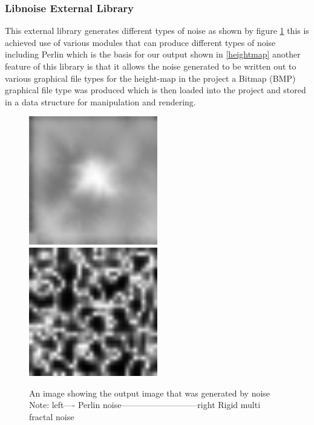 \documentclass[12pt,a4paper]{article}
\begin{document}
\subsubsection{Libnoise External Library}
This external library generates different types of noise as shown by figure \ref{noise} this is achieved use of various modules that can produce different types of noise including Perlin which is the basis for our output shown in \ref{heightmap} another feature of this library is that it allows the noise generated to be written out to various graphical file types for the height-map in the project a Bitmap (BMP) graphical file type was produced which is then loaded into the project and stored in a data structure for manipulation and rendering.\\
\begin{figure}[ht!]
	\includegraphics[width=0.5\textwidth]{images/heightmaptest}
	\includegraphics[width=0.5\textwidth]{images/RMFnoise}
	\caption{An image showing the output image that was generated by noise\\ Note: left---- Perlin noise---------------------------right Rigid multi fractal noise}	 \label{noise}
\end{figure}
\end{document}
